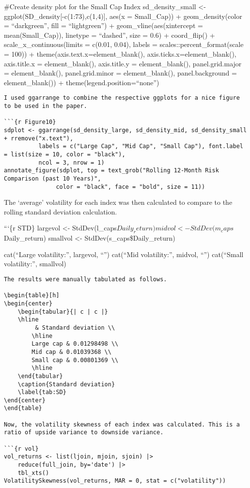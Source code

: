 \documentclass[
]{article}
\begin{document}
\#Create density plot for the Small Cap Index sd\_density\_small
\textless- ggplot(SD\_density{[}-c(1:73),c(1,4){]}, aes(x = Small\_Cap))
+ geom\_density(color = ``darkgreen'', fill = ``lightgreen'') +
geom\_vline(aes(xintercept = mean(Small\_Cap)), linetype = ``dashed'',
size = 0.6) + coord\_flip() + scale\_x\_continuous(limits = c(0.01,
0.04), labels = scales::percent\_format(scale = 100)) +
theme(axis.text.x=element\_blank(), axis.ticks.x=element\_blank(),
axis.title.x = element\_blank(), axis.title.y = element\_blank(),
panel.grid.major = element\_blank(), panel.grid.minor =
element\_blank(), panel.background = element\_blank()) +
theme(legend.position=``none'')

\begin{verbatim}
I used ggarrange to combine the respective ggplots for a nice figure to be used in the paper. 

```{r Figure10}
sdplot <- ggarrange(sd_density_large, sd_density_mid, sd_density_small + rremove("x.text"), 
          labels = c("Large Cap", "Mid Cap", "Small Cap"), font.label = list(size = 10, color = "black"),
          ncol = 3, nrow = 1)
annotate_figure(sdplot, top = text_grob("Rolling 12-Month Risk Comparison (past 10 Years)", 
               color = "black", face = "bold", size = 11))
\end{verbatim}

The `average' volatility for each index was then calculated to compare
to the rolling standard deviation calculation.

```\{r STD\} largevol \textless-
StdDev(l\_caps\(Daily_return) midvol <- StdDev(m_caps\)Daily\_return)
smallvol \textless- StdDev(s\_caps\$Daily\_return)

cat(``Large volatility:'', largevol, ``\n'') cat(``Mid volatility:'',
midvol, ``\n'') cat(``Small volatility:'', smallvol)

\begin{verbatim}
The results were manually tabulated as follows. 

\begin{table}[h]
\begin{center}
    \begin{tabular}{| c | c |}
    \hline
         & Standard deviation \\
        \hline
        Large cap & 0.01298498 \\
        Mid cap & 0.01039368 \\
        Small cap & 0.00801369 \\
        \hline
    \end{tabular}
    \caption{Standard deviation}
    \label{tab:SD}
\end{center}
\end{table}

Now, the volatility skewness of each index was calculated. This is a ratio of upside variance to downside variance. 

```{r vol}
vol_returns <- list(ljoin, mjoin, sjoin) |>
    reduce(full_join, by='date') |> 
    tbl_xts()
VolatilitySkewness(vol_returns, MAR = 0, stat = c("volatility"))
\end{verbatim}
\end{document}
